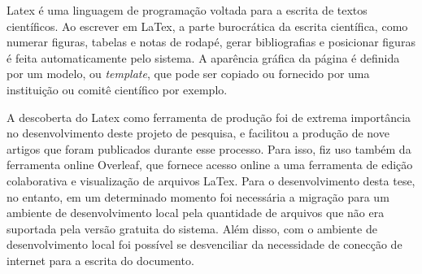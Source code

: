 Latex é uma linguagem de programação voltada para a escrita de textos científicos. Ao escrever em LaTex, a parte burocrática da escrita científica, como numerar figuras, tabelas e notas de rodapé, gerar bibliografias e posicionar figuras é feita automaticamente pelo sistema. A aparência gráfica da página é definida por um modelo, ou \emph{template}, que pode ser copiado ou fornecido por uma instituição ou comitê científico por exemplo.

A descoberta do Latex como ferramenta de produção foi de extrema importância no desenvolvimento deste projeto de pesquisa, e facilitou a produção de nove artigos que foram publicados durante esse processo. Para isso, fiz uso também da ferramenta online Overleaf, que fornece acesso online a uma ferramenta de edição colaborativa e visualização de arquivos LaTex. Para o desenvolvimento desta tese, no entanto, em um determinado momento foi necessária a migração para um ambiente de desenvolvimento local pela quantidade de arquivos que não era suportada pela versão gratuita do sistema. Além disso, com o ambiente de desenvolvimento local foi possível se desvenciliar da necessidade de conecção de internet para a escrita do documento.









